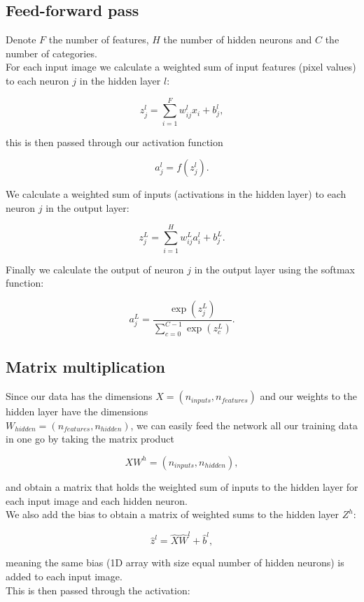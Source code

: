 \documentclass[11pt]{article}
\begin{document}
    \hypertarget{feed-forward-pass}{%
\subsection{Feed-forward pass}\label{feed-forward-pass}}

Denote \(F\) the number of features, \(H\) the number of hidden neurons
and \(C\) the number of categories.\\
For each input image we calculate a weighted sum of input features
(pixel values) to each neuron \(j\) in the hidden layer \(l\):

\[ z_{j}^{l} = \sum_{i=1}^{F} w_{ij}^{l} x_i + b_{j}^{l},\]

this is then passed through our activation function

\[ a_{j}^{l} = f(z_{j}^{l}) .\]

We calculate a weighted sum of inputs (activations in the hidden layer)
to each neuron \(j\) in the output layer:

\[ z_{j}^{L} = \sum_{i=1}^{H} w_{ij}^{L} a_{i}^{l} + b_{j}^{L}.\]

Finally we calculate the output of neuron \(j\) in the output layer
using the softmax function:

\[ a_{j}^{L} = \frac{\exp{(z_j^{L})}}
{\sum_{c=0}^{C-1} \exp{(z_c^{L})}} .\]

\hypertarget{matrix-multiplication}{%
\subsection{Matrix multiplication}\label{matrix-multiplication}}

Since our data has the dimensions \(X = (n_{inputs}, n_{features})\) and
our weights to the hidden layer have the dimensions\\
\(W_{hidden} = (n_{features}, n_{hidden})\), we can easily feed the
network all our training data in one go by taking the matrix product

\[ X W^{h} = (n_{inputs}, n_{hidden}),\]

and obtain a matrix that holds the weighted sum of inputs to the hidden
layer for each input image and each hidden neuron.\\
We also add the bias to obtain a matrix of weighted sums to the hidden
layer \(Z^{h}\):

\[ \hat{z}^{l} = \hat{X} \hat{W}^{l} + \hat{b}^{l} ,\]

meaning the same bias (1D array with size equal number of hidden
neurons) is added to each input image.\\
This is then passed through the activation:
\end{document}
